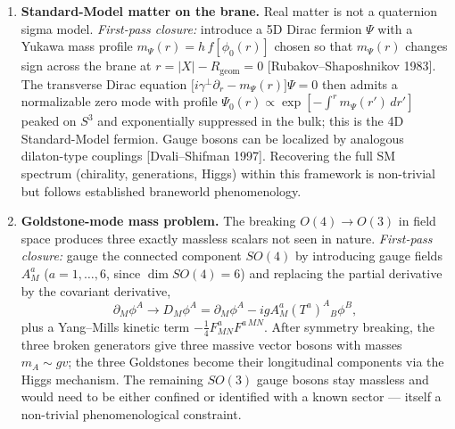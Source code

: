 \documentclass[11pt,a4paper]{article}
\newcommand{\Rgeom}{R_{\mathrm{geom}}}
\begin{document}
\begin{enumerate}[leftmargin=*]
\item \textbf{Standard-Model matter on the brane.} Real matter is not a quaternion sigma model. \emph{First-pass closure:} introduce a 5D Dirac fermion $\Psi$ with a Yukawa mass profile $m_\Psi(r)=h\,f[\phi_0(r)]$ chosen so that $m_\Psi(r)$ changes sign across the brane at $r=\lvert X\rvert-\Rgeom=0$ [Rubakov--Shaposhnikov 1983]. The transverse Dirac equation $\bigl[i\gamma^\perp\partial_r-m_\Psi(r)\bigr]\Psi=0$ then admits a normalizable zero mode with profile $\Psi_0(r)\propto\exp[-\int^r m_\Psi(r')\,dr']$ peaked on $S^3$ and exponentially suppressed in the bulk; this is the 4D Standard-Model fermion. Gauge bosons can be localized by analogous dilaton-type couplings [Dvali--Shifman 1997]. Recovering the full SM spectrum (chirality, generations, Higgs) within this framework is non-trivial but follows established braneworld phenomenology.

\item \textbf{Goldstone-mode mass problem.} The breaking $O(4)\to O(3)$ in field space produces three exactly massless scalars not seen in nature. \emph{First-pass closure:} gauge the connected component $SO(4)$ by introducing gauge fields $A_M^a$ ($a=1,\dots,6$, since $\dim SO(4)=6$) and replacing the partial derivative by the covariant derivative,
\begin{equation}
\partial_M \phi^A \longrightarrow D_M \phi^A = \partial_M \phi^A - i g A_M^a (T^a)^A{}_B \phi^B,
\end{equation}
plus a Yang--Mills kinetic term $-\tfrac{1}{4} F^a_{MN} F^{a\,MN}$. After symmetry breaking, the three broken generators give three massive vector bosons with masses $m_A\sim gv$; the three Goldstones become their longitudinal components via the Higgs mechanism. The remaining $SO(3)$ gauge bosons stay massless and would need to be either confined or identified with a known sector --- itself a non-trivial phenomenological constraint.


\end{enumerate}
\end{document}
